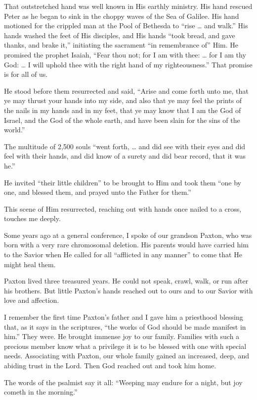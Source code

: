 \documentclass[letterpaper, 11pt]{report}
\begin{document}
That outstretched hand was well known in His earthly ministry. His hand rescued Peter as he began to sink in the choppy waves of the Sea of Galilee. His hand motioned for the crippled man at the Pool of Bethesda to “rise … and walk.” His hands washed the feet of His disciples, and His hands “took bread, and gave thanks, and brake it,” initiating the sacrament “in remembrance of” Him. He promised the prophet Isaiah, “Fear thou not; for I am with thee: … for I am thy God: … I will uphold thee with the right hand of my righteousness.” That promise is for all of us.

He stood before them resurrected and said, “Arise and come forth unto me, that ye may thrust your hands into my side, and also that ye may feel the prints of the nails in my hands and in my feet, that ye may know that I am the God of Israel, and the God of the whole earth, and have been slain for the sins of the world.”

The multitude of 2,500 souls “went forth, … and did see with their eyes and did feel with their hands, and did know of a surety and did bear record, that it was he.”

He invited “their little children” to be brought to Him and took them “one by one, and blessed them, and prayed unto the Father for them.”

This scene of Him resurrected, reaching out with hands once nailed to a cross, touches me deeply.

Some years ago at a general conference, I spoke of our grandson Paxton, who was born with a very rare chromosomal deletion. His parents would have carried him to the Savior when He called for all “afflicted in any manner” to come that He might heal them.

Paxton lived three treasured years. He could not speak, crawl, walk, or run after his brothers. But little Paxton’s hands reached out to ours and to our Savior with love and affection.

I remember the first time Paxton’s father and I gave him a priesthood blessing that, as it says in the scriptures, “the works of God should be made manifest in him.” They were. He brought immense joy to our family. Families with such a precious member know what a privilege it is to be blessed with one with special needs. Associating with Paxton, our whole family gained an increased, deep, and abiding trust in the Lord. Then God reached out and took him home.

The words of the psalmist say it all: “Weeping may endure for a night, but joy cometh in the morning.”
\end{document}
